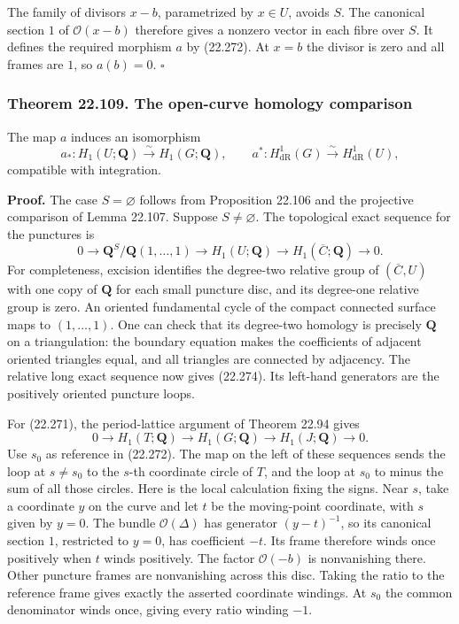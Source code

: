 \documentclass[
  11pt,
  a4paper,
]{article}
\begin{document}
The family of divisors \(x-b\), parametrized by \(x\in U\), avoids
\(S\). The canonical section \(1\) of \(\mathcal O(x-b)\) therefore
gives a nonzero vector in each fibre over \(S\). It defines the required
morphism \(a\) by (22.272). At \(x=b\) the divisor is zero and all
frames are \(1\), so \(a(b)=0\). \(\square\)

\subsubsection{Theorem 22.109. The open-curve homology
comparison}\label{theorem-22.109.-the-open-curve-homology-comparison}

The map \(a\) induces an isomorphism \[
 a_*:H_1(U;\mathbf Q)\xrightarrow{\sim}H_1(G;\mathbf Q),
 \qquad
 a^*:H^1_{\mathrm{dR}}(G)\xrightarrow{\sim}H^1_{\mathrm{dR}}(U),
 \tag{22.273}
\] compatible with integration.

\textbf{Proof.} The case \(S=\varnothing\) follows from Proposition
22.106 and the projective comparison of Lemma 22.107. Suppose
\(S\ne\varnothing\). The topological exact sequence for the punctures is
\[
 0\longrightarrow
   \mathbf Q^S/\mathbf Q(1,\ldots,1)
 \longrightarrow H_1(U;\mathbf Q)
 \longrightarrow H_1(\overline C;\mathbf Q)\longrightarrow0.
 \tag{22.274}
\] For completeness, excision identifies the degree-two relative group
of \((\overline C,U)\) with one copy of \(\mathbf Q\) for each small
puncture disc, and its degree-one relative group is zero. An oriented
fundamental cycle of the compact connected surface maps to
\((1,\ldots,1)\). One can check that its degree-two homology is
precisely \(\mathbf Q\) on a triangulation: the boundary equation makes
the coefficients of adjacent oriented triangles equal, and all triangles
are connected by adjacency. The relative long exact sequence now gives
(22.274). Its left-hand generators are the positively oriented puncture
loops.

For (22.271), the period-lattice argument of Theorem 22.94 gives \[
 0\longrightarrow H_1(T;\mathbf Q)
 \longrightarrow H_1(G;\mathbf Q)
 \longrightarrow H_1(J;\mathbf Q)\longrightarrow0.
 \tag{22.275}
\] Use \(s_0\) as reference in (22.272). The map on the left of these
sequences sends the loop at \(s\ne s_0\) to the \(s\)-th coordinate
circle of \(T\), and the loop at \(s_0\) to minus the sum of all those
circles. Here is the local calculation fixing the signs. Near \(s\),
take a coordinate \(y\) on the curve and let \(t\) be the moving-point
coordinate, with \(s\) given by \(y=0\). The bundle
\(\mathcal O(\Delta)\) has generator \((y-t)^{-1}\), so its canonical
section \(1\), restricted to \(y=0\), has coefficient \(-t\). Its frame
therefore winds once positively when \(t\) winds positively. The factor
\(\mathcal O(-b)\) is nonvanishing there. Other puncture frames are
nonvanishing across this disc. Taking the ratio to the reference frame
gives exactly the asserted coordinate windings. At \(s_0\) the common
denominator winds once, giving every ratio winding \(-1\).
\end{document}
